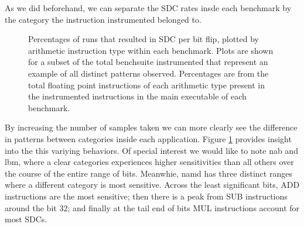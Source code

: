 \documentclass[lettersize,journal]{IEEEtran}
\begin{document}
As we did beforehand, we can separate the SDC rates insde each benchmark by the category the instruction instrumented belonged to.
\begin{figure}[!t] 
    \centering
    \hspace{0mm}
    \hspace{0mm}
\caption{Percentages of runs that resulted in SDC per bit flip, plotted by arithmetic instruction type within each benchmark. Plots are shown for a subset of the total benchsuite instrumented that represent an example of all distinct patterns observed. Percentages are from the total floating point instructions of each arithmetic type present in the instrumented instructions in the main executable of each benchmark.}
\label{percategoryfull}
\end{figure}
By increasing the number of samples taken we can more clearly see the difference in patterns between categories inside each application. Figure \ref{percategoryfull} provides insight into the this variying behaviors. Of special interest we would like to note nab and lbm, where a clear categories experiences higher sensitivities than all others over the course of the entire range of bits. Meanwhie, namd has three distinct ranges where a different category is most sensitive. Across the least significant bits, ADD instructions are the most sensitive; then there is a peak from SUB instructions around the bit 32; and finally at the tail end of bits MUL instructions account for most SDCs.\\
\end{document}
